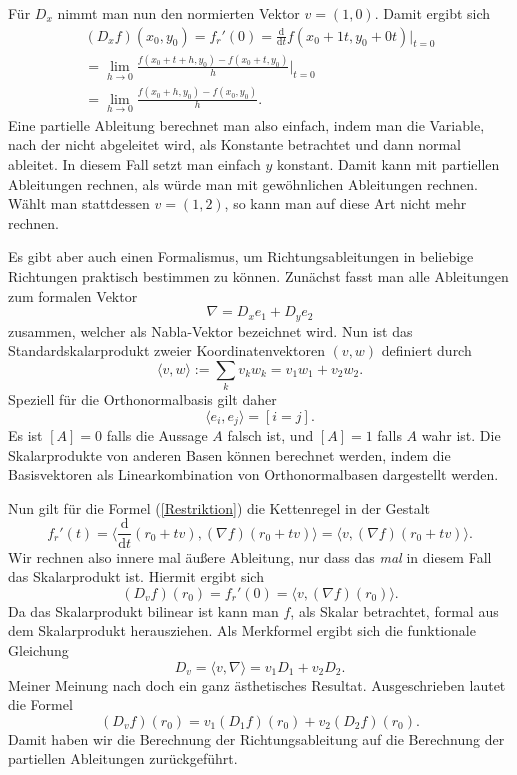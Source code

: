 \documentclass[a4paper,12pt,fleqn]{article}
\begin{document}
Für \(D_x\) nimmt man nun den normierten Vektor \(v=(1,0)\).
Damit ergibt sich
\begin{gather*}
(D_x f)(x_0,y_0) = f_r'(0)
= \frac{\mathrm d}{\mathrm dt} f(x_0+1t,y_0+0t)\Big|_{t=0}\\
= \lim_{h\rightarrow 0} \frac{f(x_0+t+h,y_0)-f(x_0+t,y_0)}{h}\Big|_{t=0}\\
= \lim_{h\rightarrow 0} \frac{f(x_0+h,y_0)-f(x_0,y_0)}{h}.
\end{gather*}
Eine partielle Ableitung berechnet man also einfach, indem man
die Variable, nach der nicht abgeleitet wird, als Konstante
betrachtet und dann normal ableitet. In diesem Fall setzt man einfach
\(y\) konstant. Damit kann mit partiellen Ableitungen rechnen,
als würde man mit gewöhnlichen Ableitungen rechnen. Wählt man
stattdessen \(v=(1,2)\), so kann man auf diese Art nicht mehr
rechnen.

Es gibt aber auch einen Formalismus, um Richtungsableitungen
in beliebige Richtungen praktisch bestimmen zu können.
Zunächst fasst man alle Ableitungen zum formalen Vektor
\begin{equation}
\nabla = D_x e_1+D_y e_2
\end{equation}
zusammen, welcher als Nabla-Vektor bezeichnet wird. Nun ist das
Standardskalarprodukt zweier Koordinatenvektoren \((v,w)\) definiert
durch
\begin{equation}
\langle v,w\rangle := \sum_k v_k w_k = v_1 w_1+v_2 w_2.
\end{equation}
Speziell für die Orthonormalbasis gilt daher
\begin{equation}
\langle e_i,e_j\rangle = [i=j].
\end{equation}
Es ist \([A]=0\) falls die Aussage \(A\) falsch ist, und \([A]=1\)
falls \(A\) wahr ist. Die Skalarprodukte von anderen Basen können
berechnet werden, indem die Basisvektoren als Linearkombination
von Orthonormalbasen dargestellt werden.

Nun gilt für die Formel (\ref{Restriktion}) die Kettenregel
in der Gestalt
\begin{equation}
f_r'(t) = \langle\frac{\mathrm d}{\mathrm dt}(r_0+tv),
(\nabla f)(r_0+tv)\rangle
= \langle v,(\nabla f)(r_0+tv)\rangle.
\end{equation}
Wir rechnen also innere mal äußere Ableitung, nur dass das
\textit{mal} in diesem Fall das Skalarprodukt ist. Hiermit ergibt
sich
\begin{equation}
(D_v f)(r_0) = f_r'(0) = \langle v,(\nabla f)(r_0)\rangle.
\end{equation}
Da das Skalarprodukt bilinear ist kann man \(f\), als Skalar
betrachtet, formal aus dem Skalarprodukt herausziehen.
Als Merkformel ergibt sich die funktionale Gleichung
\begin{equation}\label{Richtungsableitung}
D_v = \langle v,\nabla\rangle = v_1D_1+v_2D_2.
\end{equation}
Meiner Meinung nach doch ein ganz ästhetisches Resultat.
Ausgeschrieben lautet die Formel
\begin{equation}\label{RAexpandiert}
(D_v f)(r_0) = v_1(D_1 f)(r_0)+ v_2(D_2 f)(r_0).
\end{equation}
Damit haben wir die Berechnung der Richtungsableitung auf
die Berechnung der partiellen Ableitungen zurückgeführt.
\end{document}
